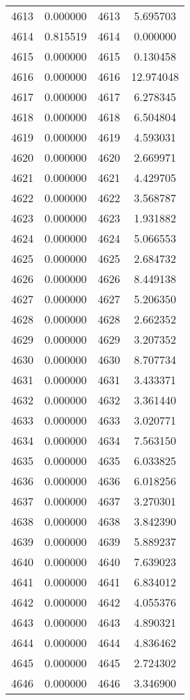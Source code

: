 \documentclass[12pt]{article}
\begin{document}
\begin{longtable}{@{}cccc@{}}
4613 & 0.000000 & 4613 & 5.695703 \\
4614 & 0.815519 & 4614 & 0.000000 \\
4615 & 0.000000 & 4615 & 0.130458 \\
4616 & 0.000000 & 4616 & 12.974048 \\
4617 & 0.000000 & 4617 & 6.278345 \\
4618 & 0.000000 & 4618 & 6.504804 \\
4619 & 0.000000 & 4619 & 4.593031 \\
4620 & 0.000000 & 4620 & 2.669971 \\
4621 & 0.000000 & 4621 & 4.429705 \\
4622 & 0.000000 & 4622 & 3.568787 \\
4623 & 0.000000 & 4623 & 1.931882 \\
4624 & 0.000000 & 4624 & 5.066553 \\
4625 & 0.000000 & 4625 & 2.684732 \\
4626 & 0.000000 & 4626 & 8.449138 \\
4627 & 0.000000 & 4627 & 5.206350 \\
4628 & 0.000000 & 4628 & 2.662352 \\
4629 & 0.000000 & 4629 & 3.207352 \\
4630 & 0.000000 & 4630 & 8.707734 \\
4631 & 0.000000 & 4631 & 3.433371 \\
4632 & 0.000000 & 4632 & 3.361440 \\
4633 & 0.000000 & 4633 & 3.020771 \\
4634 & 0.000000 & 4634 & 7.563150 \\
4635 & 0.000000 & 4635 & 6.033825 \\
4636 & 0.000000 & 4636 & 6.018256 \\
4637 & 0.000000 & 4637 & 3.270301 \\
4638 & 0.000000 & 4638 & 3.842390 \\
4639 & 0.000000 & 4639 & 5.889237 \\
4640 & 0.000000 & 4640 & 7.639023 \\
4641 & 0.000000 & 4641 & 6.834012 \\
4642 & 0.000000 & 4642 & 4.055376 \\
4643 & 0.000000 & 4643 & 4.890321 \\
4644 & 0.000000 & 4644 & 4.836462 \\
4645 & 0.000000 & 4645 & 2.724302 \\
4646 & 0.000000 & 4646 & 3.346900 \\

\end{longtable}
\end{document}
